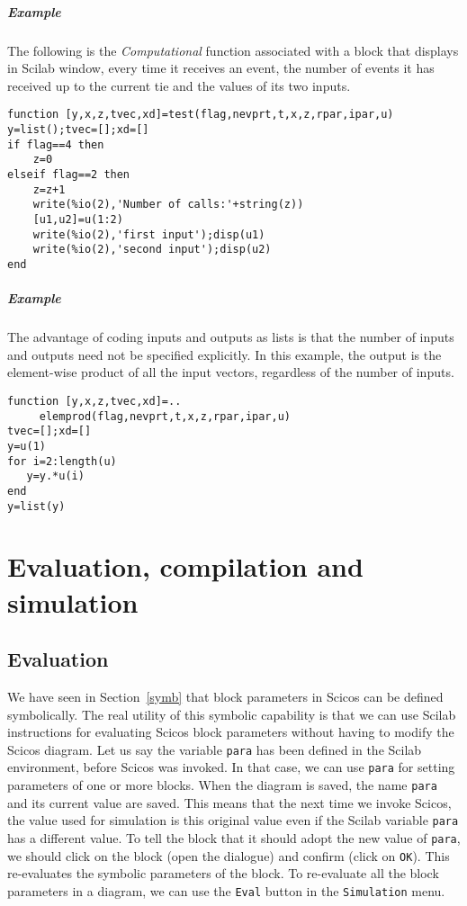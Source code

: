 \documentclass{book}
\newcommand{\computational}{{\em Computational }}
\begin{document}
\paragraph{Example}
The following is the \computational function associated with a block
that displays in Scilab window, every time it receives an event, the
number of events it has received up to the current tie and the values
of its two inputs.
\begin{verbatim}
function [y,x,z,tvec,xd]=test(flag,nevprt,t,x,z,rpar,ipar,u)
y=list();tvec=[];xd=[]
if flag==4 then
    z=0
elseif flag==2 then
    z=z+1
    write(%io(2),'Number of calls:'+string(z))
    [u1,u2]=u(1:2)
    write(%io(2),'first input');disp(u1)
    write(%io(2),'second input');disp(u2)
end
\end{verbatim}

\paragraph{Example}
The advantage of coding inputs and outputs as lists is that
the number of inputs and outputs need not be specified
explicitly. In this example, the output is the element-wise
product of all the input vectors, regardless of the number
of inputs.

\begin{verbatim}
function [y,x,z,tvec,xd]=..
     elemprod(flag,nevprt,t,x,z,rpar,ipar,u)
tvec=[];xd=[]
y=u(1)
for i=2:length(u)
   y=y.*u(i)
end
y=list(y)
\end{verbatim}



\chapter{Evaluation, compilation and simulation}
\label{Evaluation}
\section{Evaluation}
We have seen in Section~\ref{symb} that block parameters in Scicos
can be defined symbolically.
The real utility of this symbolic capability is that we can use Scilab
instructions for evaluating Scicos block parameters without having to
modify the Scicos diagram. Let us say the variable {\tt para}
has been defined in the Scilab environment, before Scicos was invoked.
In that case, we can use {\tt para} for setting parameters of one or more blocks. 
When the diagram is saved, the
name {\tt para} and its current value are saved. This means that the next time
we invoke Scicos, the value used for simulation is this original value
even if the Scilab variable {\tt para} has a different value. To tell the block that it should
adopt the new value of {\tt para}, we should click on the block (open
the dialogue) and confirm (click on {\tt OK}). This re-evaluates the symbolic
parameters of the block. To re-evaluate all the block parameters in a
diagram, we can use the {\tt Eval} button in the {\tt Simulation} menu.
\end{document}
